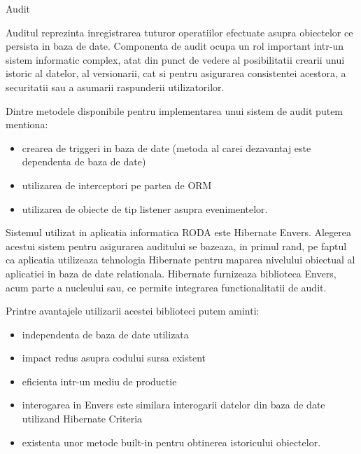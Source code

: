 \documentclass{article}
\title{}
\begin{document}
\clearpage\setcounter{page}{1}
\bigskip

Audit


\bigskip

Auditul reprezinta inregistrarea tuturor operatiilor efectuate asupra obiectelor ce persista in baza de date. Componenta de audit ocupa un rol important intr-un sistem informatic complex, atat din punct de vedere al posibilitatii crearii unui istoric al datelor, al versionarii, cat si pentru asigurarea consistentei acestora, a securitatii sau a asumarii raspunderii utilizatorilor.


\bigskip

Dintre metodele disponibile pentru implementarea unui sistem de audit putem mentiona:

\begin{itemize}
\item crearea de triggeri in baza de date (metoda al carei dezavantaj este dependenta de baza de date)
\item utilizarea de interceptori pe partea de ORM
\item utilizarea de obiecte de tip listener asupra evenimentelor.
\end{itemize}

\bigskip

Sistemul utilizat in aplicatia informatica RODA este Hibernate Envers. Alegerea acestui sistem pentru asigurarea auditului se bazeaza, in primul rand, pe faptul ca aplicatia utilizeaza tehnologia Hibernate pentru maparea nivelului obiectual al aplicatiei in baza de date relationala. Hibernate furnizeaza biblioteca Envers, acum parte a nucleului sau, ce permite integrarea functionalitatii de audit. \ 


\bigskip

Printre avantajele utilizarii acestei biblioteci putem aminti:

\begin{itemize}
\item independenta de baza de date utilizata
\item impact redus asupra codului sursa existent
\item eficienta intr-un mediu de productie
\item interogarea in Envers este similara interogarii datelor din baza de date utilizand Hibernate Criteria
\item existenta unor metode built-in pentru obtinerea istoricului obiectelor.
\end{itemize}

\bigskip
\end{document}
